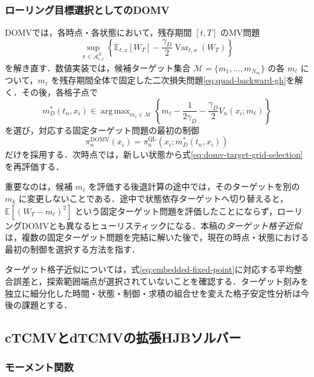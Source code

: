 \documentclass[10pt,a4paper]{article}
\theoremstyle{plain}
\theoremstyle{definition}
\newcommand{\E}{\mathbb{E}}
\DeclareMathOperator{\Var}{Var}
\DeclareMathOperator*{\argmax}{arg\,max}
\newcommand{\A}{\mathcal{A}}
\begin{document}
\subsubsection{ローリング目標選択としてのDOMV}

DOMVでは，各時点・各状態において，残存期間 $[t,T]$ のMV問題
\begin{equation}
  \sup_{\pi\in\A^X_{t,x}}
  \left\{
    \E_{t,x}[W_T]
    -\frac{\gamma_D}{2}\Var_{t,x}(W_T)
  \right\}
  \label{eq:domv-discrete-problem}
\end{equation}
を解き直す．数値実装では，候補ターゲット集合 $\mathcal M=\{m_1,\ldots,m_{N_m}\}$ の各 $m_\ell$ について，$m_\ell$ を残存期間全体で固定した二次損失問題\eqref{eq:quad-backward-gh}を解く．その後，各格子点で
\begin{equation}
  m_D^*(t_n,x_i)
  \in\argmax_{m_\ell\in\mathcal M}
  \left\{
    m_\ell-\frac{1}{2\gamma_D}
    -\frac{\gamma_D}{2}V_n(x_i;m_\ell)
  \right\}
  \label{eq:domv-target-grid-selection}
\end{equation}
を選び，対応する固定ターゲット問題の最初の制御
\begin{equation}
  \pi_n^{\mathrm{DOMV}}(x_i)
  =\pi_n^{\mathrm{QL}}\!\left(x_i;m_D^*(t_n,x_i)\right)
  \label{eq:domv-first-control}
\end{equation}
だけを採用する．次時点では，新しい状態から式\eqref{eq:domv-target-grid-selection}を再評価する．

重要なのは，候補 $m_\ell$ を評価する後退計算の途中では，そのターゲットを別の $m_k$ に変更しないことである．途中で状態依存ターゲットへ切り替えると，$\E[(W_T-m_\ell)^2]$ という固定ターゲット問題を評価したことにならず，ローリングDOMVとも異なるヒューリスティックになる．本稿の\emph{ターゲット格子近似}は，複数の固定ターゲット問題を完結に解いた後で，現在の時点・状態における最初の制御を選択する方法を指す．

ターゲット格子近似については，式\eqref{eq:embedded-fixed-point}に対応する平均整合誤差と，探索範囲端点が選択されていないことを確認する．ターゲット刻みを独立に細分化した時間・状態・制御・求積の組合せを変えた格子安定性分析は今後の課題とする．

\subsection{cTCMVとdTCMVの拡張HJBソルバー}
\label{sec:extended}

\subsubsection{モーメント関数}
\end{document}
